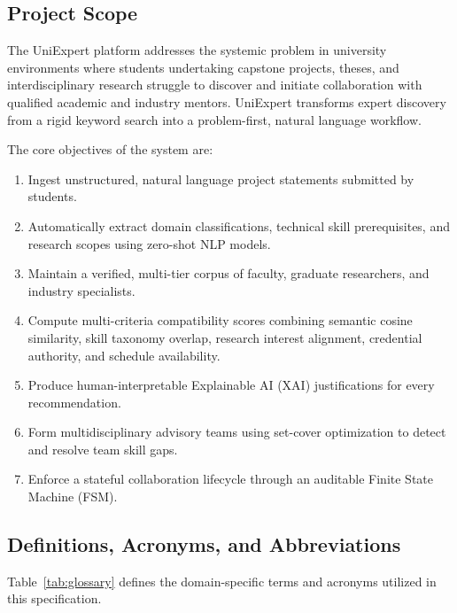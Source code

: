\documentclass[11pt,a4paper]{article}
\begin{document}
\subsection{Project Scope}
The UniExpert platform addresses the systemic problem in university environments where students undertaking capstone projects, theses, and interdisciplinary research struggle to discover and initiate collaboration with qualified academic and industry mentors. UniExpert transforms expert discovery from a rigid keyword search into a problem-first, natural language workflow.

The core objectives of the system are:
\begin{enumerate}[label=\textbf{(\arabic*)},noitemsep]
    \item Ingest unstructured, natural language project statements submitted by students.
    \item Automatically extract domain classifications, technical skill prerequisites, and research scopes using zero-shot NLP models.
    \item Maintain a verified, multi-tier corpus of faculty, graduate researchers, and industry specialists.
    \item Compute multi-criteria compatibility scores combining semantic cosine similarity, skill taxonomy overlap, research interest alignment, credential authority, and schedule availability.
    \item Produce human-interpretable Explainable AI (XAI) justifications for every recommendation.
    \item Form multidisciplinary advisory teams using set-cover optimization to detect and resolve team skill gaps.
    \item Enforce a stateful collaboration lifecycle through an auditable Finite State Machine (FSM).
\end{enumerate}

\subsection{Definitions, Acronyms, and Abbreviations}
Table~\ref{tab:glossary} defines the domain-specific terms and acronyms utilized in this specification.
\end{document}

